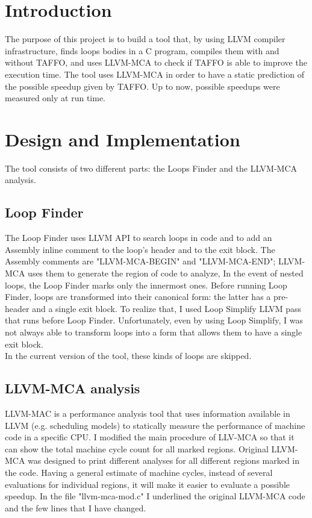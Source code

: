 \section{Introduction}

The purpose of this project is to build a tool that, by using LLVM compiler infrastructure, finds loops bodies in a C program, compiles them with and without TAFFO, and uses LLVM-MCA to check if TAFFO is able to improve the execution time.
The tool uses LLVM-MCA in order to have a static prediction of the possible speedup given by TAFFO. Up to now, possible speedups were measured only at run time.

\section{Design and Implementation}
The tool consists of two different parts: the Loops Finder and the LLVM-MCA analysis.

\subsection{Loop Finder}
The Loop Finder uses LLVM API to search loops in code and to add an Assembly inline comment to the loop's header and to the exit block.
The Assembly comments are "LLVM-MCA-BEGIN" and "LLVM-MCA-END"; 
 LLVM-MCA uses them to generate the region of code to analyze,
In the event of nested loops, the Loop Finder marks only the innermost ones.
Before running Loop Finder, loops are transformed into their canonical form: the latter has a pre-header and a single exit block. To realize that, I used Loop Simplify LLVM pass that runs before Loop Finder.
Unfortunately, even by using Loop Simplify, I was not always able to transform loops into a form that allows them to have a single exit block.\\
In the current version of the tool, these kinds of loops are skipped.

\subsection{LLVM-MCA analysis}

LLVM-MAC is a performance analysis tool that uses information available in LLVM (e.g. scheduling models) to statically measure the performance of machine code in a specific CPU.
I modified the main procedure of LLV-MCA so that it can show the total machine cycle count for all marked regions. Original LLVM-MCA was designed to print different analyses for all different regions marked in the code.
Having a general estimate of machine cycles, instead of several evaluations for individual regions, it will make it easier to evaluate a possible speedup.
In the file "llvm-mca-mod.c" I underlined the original LLVM-MCA code and the few lines that I have changed.


